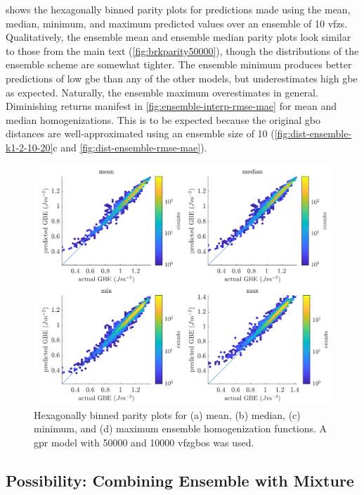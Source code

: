 \documentclass[preprint,12pt]{elsarticle}
\begin{document}
	 shows the hexagonally binned parity plots for predictions made using the mean, median, minimum, and maximum predicted values over an ensemble of 10 \glspl{vfz}. Qualitatively, the ensemble mean and ensemble median parity plots look similar to those from the main text (\cref{fig:brkparity50000}), though the distributions of the ensemble scheme are somewhat tighter. The ensemble minimum produces better predictions of low \gls{gbe} than any of the other models, but underestimates high \gls{gbe} as expected. Naturally, the ensemble maximum overestimates in general. Diminishing returns manifest in \cref{fig:ensemble-interp-rmse-mae} for mean and median homogenizations. This is to be expected because the original \gls{gbo} distances \cite{francisGeodesicOctonionMetric2019} are well-approximated using an ensemble size of 10 (\cref{fig:dist-ensemble-k1-2-10-20}c and \cref{fig:dist-ensemble-rmse-mae}).
	\begin{figure}[h!]
		\centering
		\includegraphics[scale=1]{figures/ensemble-interp.png}
		\caption{Hexagonally binned parity plots for (a) mean, (b) median, (c) minimum, and (d) maximum ensemble homogenization functions. A \gls{gpr} model with \num{50000} \inpt{} and \num{10000} \outpt{} \glspl{vfzgbo} was used. }
		\label{fig:ensemble-interp}
	\end{figure}
	
	\subsection{Possibility: Combining Ensemble with  Mixture}
	\label{sec:ensemble-interp:egprm}
	
\end{document}
